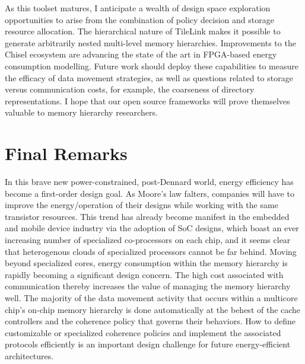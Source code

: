As this toolset matures, I anticipate a wealth of design space exploration opportunities to arise
from the combination of policy decision and storage resource allocation.
The hierarchical nature of TileLink makes it possible to generate arbitrarily nested multi-level memory hierarchies.
Improvements to the Chisel ecosystem are advancing the state of the art in FPGA-based energy consumption modelling.
Future work should deploy these capabilities to measure the efficacy of data movement strategies,
as well as questions related to storage versus communication costs, for example, the coarseness of directory representations.
I hope that our open source frameworks will prove themselves valuable to memory hierarchy researchers.

\section{Final Remarks}

In this brave new power-constrained, post-Dennard world, energy efficiency has become a first-order design goal.
As Moore's law falters, companies will have to improve the energy/operation of their designs
while working with the same transistor resources.
This trend has already become manifest in the embedded and mobile device industry via the adoption of SoC designs, which boast an ever increasing number of specialized co-processors on each chip, and it seems clear that heterogenous clouds of specialized processors cannot be far behind.
Moving beyond specialized cores, energy consumption within the memory hierarchy is rapidly becoming a significant design concern.
The high cost associated with communication thereby increases the value of managing the memory hierarchy well.
The majority of the data movement activity that occurs within a multicore chip's on-chip memory hierarchy is done automatically at the behest of the cache controllers and the coherence policy that governs their behaviors.
How to define customizable or specialized coherence policies and
implement the associated protocols efficiently is an important design challenge for future energy-efficient architectures. 

